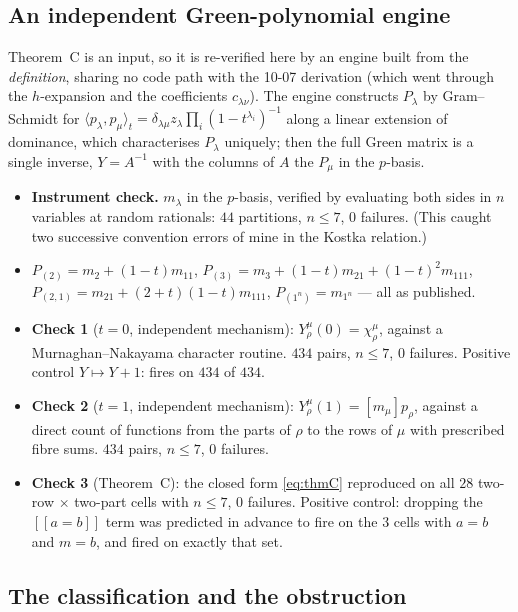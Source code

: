 \documentclass[11pt]{article}
\theoremstyle{definition}
\newcommand{\lam}{\lambda}
\newcommand{\lb}{[\![}
\newcommand{\rb}{]\!]}
\begin{document}
\subsection{An independent Green-polynomial engine}

Theorem~C is an input, so it is re-verified here by an engine built from the \emph{definition},
sharing no code path with the 10-07 derivation (which went through the $h$-expansion and the
coefficients $c_{\lam\nu}$). The engine constructs $P_\lam$ by Gram--Schmidt for
$\langle p_\lam,p_\mu\rangle_t=\delta_{\lam\mu}z_\lam\prod_i(1-t^{\lam_i})^{-1}$ along a linear
extension of dominance, which characterises $P_\lam$ uniquely; then the full Green matrix is a
single inverse, $Y=A^{-1}$ with the columns of $A$ the $P_\mu$ in the $p$-basis.

\begin{itemize}
\item \textbf{Instrument check.} $m_\lam$ in the $p$-basis, verified by evaluating both sides in
$n$ variables at random rationals: $44$ partitions, $n\le7$, $0$ failures. (This caught two
successive convention errors of mine in the Kostka relation.)
\item $P_{(2)}=m_{2}+(1-t)m_{11}$, $P_{(3)}=m_3+(1-t)m_{21}+(1-t)^2m_{111}$,
$P_{(2,1)}=m_{21}+(2+t)(1-t)m_{111}$, $P_{(1^n)}=m_{1^n}$ --- all as published.
\item \textbf{Check 1} ($t=0$, independent mechanism): $Y^{\mu}_{\rho}(0)=\chi^{\mu}_{\rho}$,
against a Murnaghan--Nakayama character routine. $434$ pairs, $n\le7$, $0$ failures. Positive
control $Y\mapsto Y+1$: fires on $434$ of $434$.
\item \textbf{Check 2} ($t=1$, independent mechanism): $Y^{\mu}_{\rho}(1)=[m_\mu]p_\rho$, against
a direct count of functions from the parts of $\rho$ to the rows of $\mu$ with prescribed fibre
sums. $434$ pairs, $n\le7$, $0$ failures.
\item \textbf{Check 3} (Theorem~C): the closed form \eqref{eq:thmC} reproduced on all $28$
two-row $\times$ two-part cells with $n\le7$, $0$ failures. Positive control: dropping the
$\lb a=b\rb$ term was predicted in advance to fire on the $3$ cells with $a=b$ and $m=b$, and
fired on exactly that set.
\end{itemize}

\subsection{The classification and the obstruction}
\end{document}

